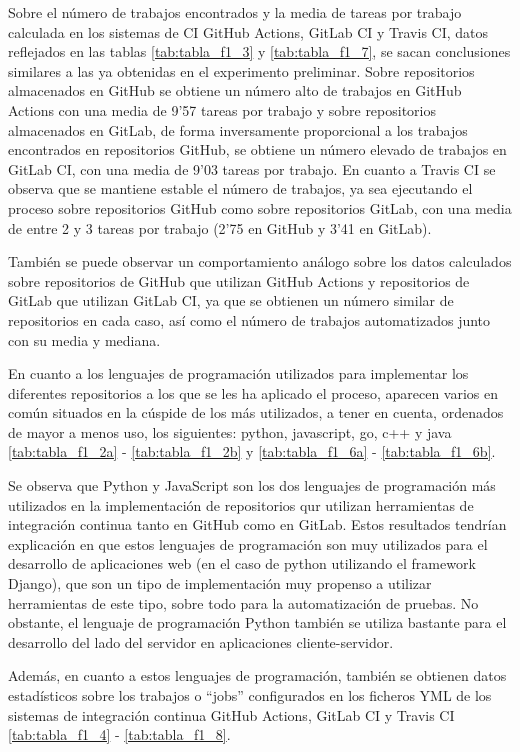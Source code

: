 Sobre el número de trabajos encontrados y la media de tareas por trabajo calculada en los sistemas de CI GitHub Actions, GitLab CI y Travis CI, datos reflejados en las tablas \ref{tab:tabla_f1_3} y \ref{tab:tabla_f1_7}, se sacan conclusiones similares a las ya obtenidas en el experimento preliminar. Sobre repositorios almacenados en GitHub se obtiene un número alto de trabajos en GitHub Actions con una media de 9'57 tareas por trabajo y sobre repositorios almacenados en GitLab, de forma inversamente proporcional a los trabajos encontrados en repositorios GitHub, se obtiene un número elevado de trabajos en GitLab CI, con una media de 9'03 tareas por trabajo. En cuanto a Travis CI se observa que se mantiene estable el número de trabajos, ya sea ejecutando el proceso sobre repositorios GitHub como sobre repositorios GitLab, con una media de entre 2 y 3 tareas por trabajo (2'75 en GitHub y 3'41 en GitLab).

También se puede observar un comportamiento análogo sobre los datos calculados sobre repositorios de GitHub que utilizan GitHub Actions y repositorios de GitLab que utilizan GitLab CI, ya que se obtienen un número similar de repositorios en cada caso, así como el número de trabajos automatizados junto con su media y mediana.

En cuanto a los lenguajes de programación utilizados para implementar los diferentes repositorios a los que se les ha aplicado el proceso, aparecen varios en común situados en la cúspide de los más utilizados, a tener en cuenta, ordenados de mayor a menos uso, los siguientes: python, javascript, go, c++ y java \ref{tab:tabla_f1_2a} - \ref{tab:tabla_f1_2b} y \ref{tab:tabla_f1_6a} - \ref{tab:tabla_f1_6b}.

Se observa que Python y JavaScript son los dos lenguajes de programación más utilizados en la implementación de repositorios qur utilizan herramientas de integración continua tanto en GitHub como en GitLab. Estos resultados tendrían explicación en que estos lenguajes de programación son muy utilizados para el desarrollo de aplicaciones web (en el caso de python utilizando el framework Django), que son un tipo de implementación muy propenso a utilizar herramientas de este tipo, sobre todo para la automatización de pruebas. No obstante, el lenguaje de programación Python también se utiliza bastante para el desarrollo del lado del servidor en aplicaciones cliente-servidor. 

Además, en cuanto a estos lenguajes de programación, también se obtienen datos estadísticos sobre los trabajos o ``jobs'' configurados en los ficheros YML de los sistemas de integración continua GitHub Actions, GitLab CI y Travis CI \ref{tab:tabla_f1_4} - \ref{tab:tabla_f1_8}.

